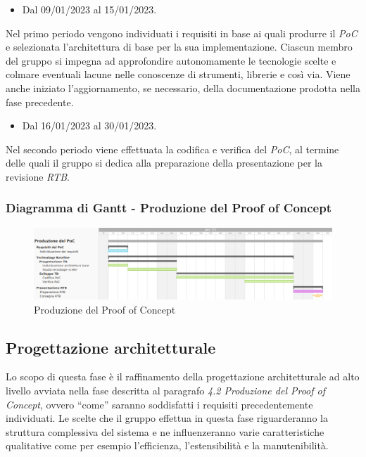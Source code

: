 \begin{itemize}
    \item Dal 09/01/2023 al 15/01/2023.
\end{itemize}
Nel primo periodo vengono individuati i requisiti in base ai quali produrre il \textit{PoC} e selezionata l’architettura di base per la sua implementazione. Ciascun membro del gruppo si impegna ad approfondire autonomamente le tecnologie scelte e colmare eventuali lacune nelle conoscenze di strumenti, librerie e così via. Viene anche iniziato l'aggiornamento, se necessario, della documentazione prodotta nella fase precedente.

\begin{itemize}
    \item Dal 16/01/2023 al 30/01/2023.
\end{itemize}
Nel secondo periodo viene effettuata la codifica e verifica del \textit{PoC}, al termine delle quali il gruppo si dedica alla preparazione della presentazione per la revisione \textit{RTB}.

\subsubsection{Diagramma di Gantt - Produzione del Proof of Concept}

\begin{figure}[H]
\centering
\includegraphics[width=\textwidth]{img/4_produzione.png}
\caption{Produzione del Proof of Concept}
\end{figure}

\subsection{Progettazione architetturale}
Lo scopo di questa fase è il raffinamento della progettazione architetturale ad alto livello avviata nella fase descritta al paragrafo \textit{4.2 Produzione del Proof of Concept}, ovvero “come” saranno soddisfatti i requisiti precedentemente individuati.
Le scelte che il gruppo effettua in questa fase riguarderanno la struttura complessiva del sistema e ne influenzeranno varie caratteristiche qualitative come per esempio l’efficienza, l’estensibilità e la manutenibilità.

